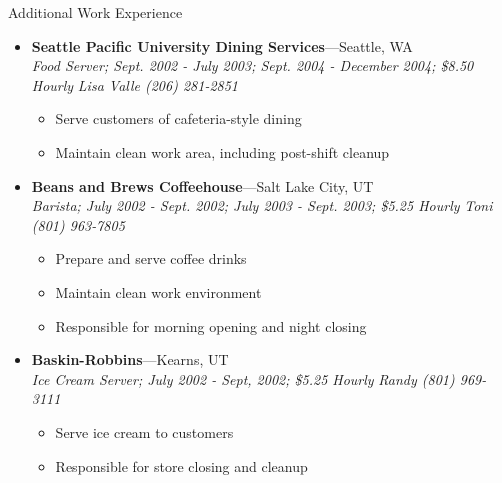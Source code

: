 \documentclass[11pt,oneside]{article}
\newenvironment{ressection}[1]{
    \vspace{4pt}
    {\fontfamily{phv}\selectfont\Large#1}
    \begin{itemize}
    \vspace{3pt}
}{
    \end{itemize}
}
\newcommand{\ressubitem}[1]{
    \vspace{-1pt}
    \item \begin{flushleft} #1 \end{flushleft}
}
\newenvironment{ressubsec}[4]{
    \item
    \textbf{#1}---#2 \\
    \textit{#3}
    \newline
    \textit{#4}
    \vspace{-2pt}
    \begin{itemize}
}{
    \end{itemize}
}
\begin{document}
\begin{ressection}{Additional Work Experience}

    \begin{ressubsec}{Seattle Pacific University Dining Services}{Seattle, WA}{Food Server; Sept. 2002 - July 2003; Sept. 2004 - December 2004; \$8.50 Hourly}{Lisa Valle (206) 281-2851}
        \ressubitem{Serve customers of cafeteria-style dining}
        \ressubitem{Maintain clean work area, including post-shift cleanup}
    \end{ressubsec}

    \begin{ressubsec}{Beans and Brews Coffeehouse}{Salt Lake City, UT}{Barista; July 2002 - Sept. 2002; July 2003 - Sept. 2003; \$5.25 Hourly}{Toni (801) 963-7805}
        \ressubitem{Prepare and serve coffee drinks}
        \ressubitem{Maintain clean work environment}
        \ressubitem{Responsible for morning opening and night closing}
    \end{ressubsec}

    \begin{ressubsec}{Baskin-Robbins}{Kearns, UT}{Ice Cream Server; July 2002 - Sept, 2002; \$5.25 Hourly}{Randy (801) 969-3111}
        \ressubitem{Serve ice cream to customers}
        \ressubitem{Responsible for store closing and cleanup}
    \end{ressubsec}


\end{ressection}
\end{document}
